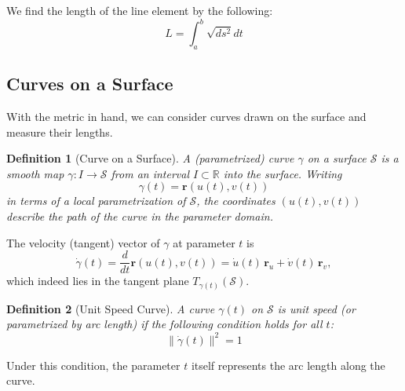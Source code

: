 \documentclass[12pt]{article}
\newtheorem{definition}{Definition}[section]
\begin{document}
We find the length of the line element by the following:
\[
	L = \int_{a}^{b} \sqrt{ds^{2}} dt
\]

\subsection{Curves on a Surface}
With the metric in hand, we can consider curves drawn on the surface and measure their lengths. 

\begin{definition}[Curve on a Surface]\label{def:curve}
A (parametrized) curve $\gamma$ on a surface $\mathcal{S}$ is a smooth map $\gamma: I \to \mathcal{S}$ from an interval $I\subset \mathbb{R}$ into the surface. 
Writing 
\begin{equation}\label{eq:curve-param}
	\gamma(t) = \mathbf{r}(u(t), v(t))
\end{equation}
in terms of a local parametrization of $\mathcal{S}$, the coordinates $(u(t), v(t))$ describe the path of the curve in the parameter domain. 
\end{definition}
The velocity (tangent) vector of $\gamma$ at parameter $t$ is 
\begin{equation}\label{eq:curve-vel}
	\dot\gamma(t) = \frac{d}{dt}\mathbf{r}(u(t), v(t)) = \dot{u}(t)\,\mathbf{r}_u + \dot{v}(t)\,\mathbf{r}_v,
\end{equation}
which indeed lies in the tangent plane $T_{\gamma(t)}(\mathcal{S})$. 


\begin{definition}[Unit Speed Curve]\label{def:unit-speed}
A curve $\gamma(t)$ on $\mathcal{S}$ is \emph{unit speed} (or parametrized by arc length) if the following condition holds for all $t$:
\[
\|\dot{\gamma}(t)\|^{2} = 1
\] 
\end{definition}

Under this condition, the parameter $t$ itself represents the arc length along the curve. 
\end{document}
